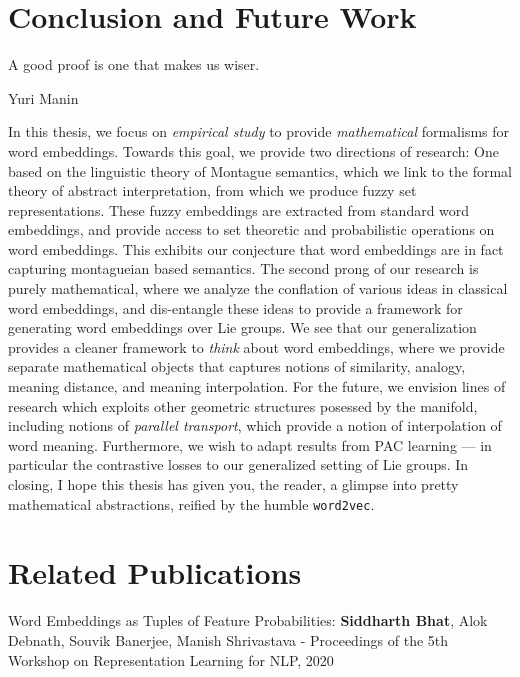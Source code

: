 \documentclass[11pt]{book}
\begin{document}
\chapter{Conclusion and Future Work}

\epigraph{A good proof is one that makes us wiser.}{Yuri Manin}

In this thesis, we focus on \emph{empirical study} to provide
\emph{mathematical} formalisms for word embeddings. Towards this goal, we
provide two directions of research: One based on the linguistic theory of
Montague semantics, which we link to the formal theory of abstract
interpretation, from which we produce fuzzy set representations. These fuzzy
embeddings are extracted from standard word embeddings, and provide access to
set theoretic and probabilistic operations on word embeddings. This exhibits
our conjecture that word embeddings are in fact capturing montagueian based
semantics. The second prong of our research is purely mathematical, where we
analyze the conflation of various ideas in classical word embeddings, and
dis-entangle these ideas to provide a framework for generating word embeddings
over Lie groups.  We see that our generalization provides a cleaner framework
to \emph{think} about word embeddings, where we provide separate mathematical
objects that captures notions of similarity, analogy, meaning distance, and
meaning interpolation.  For the future, we envision lines of research which
exploits other geometric structures posessed by the manifold, including notions
of \emph{parallel transport}, which provide a notion of interpolation of word
meaning. Furthermore, we wish to adapt results from PAC learning --- in
particular the contrastive losses \cite{arora2019theoretical} to our
generalized setting of Lie groups.  In closing, I hope this thesis has given
you, the reader, a glimpse into pretty mathematical abstractions, reified by
the humble \texttt{word2vec}.


\chapter*{Related Publications}
\label{ch:relatedPubs}
% 


Word Embeddings as Tuples of Feature Probabilities: \textbf{Siddharth Bhat},
Alok Debnath, Souvik Banerjee, Manish Shrivastava - Proceedings of the 5th
Workshop on Representation Learning for NLP, 2020


\nocite{*}

% 

\end{document}
